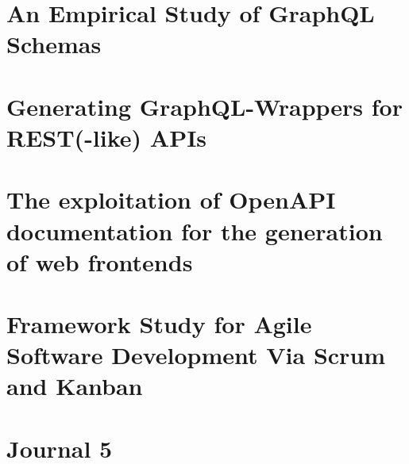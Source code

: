 \documentclass[oneside,openright,titlepage,numbers=noenddot,headinclude,footinclude=true,cleardoublepage=empty,listof=totoc,paper=a4,fontsize=11pt,english,BCOR=5mm]{scrreprt}
\begin{document}
  \frenchspacing
  \raggedbottom{}

  \pagestyle{plain}

  \singlespacing{}
  

  \cleardoublepage{}
  \pagestyle{scrheadings}
  \onehalfspacing{}

  \chapter{An Empirical Study of GraphQL Schemas}\label{c:Journal-1}
  

  \chapter{Generating GraphQL-Wrappers for REST(-like) APIs}\label{c:Journal-2}
  

  \chapter{The exploitation of OpenAPI documentation for the generation of web
  frontends}\label{c:Journal-3}
  

  \chapter{Framework Study for Agile Software Development Via Scrum and Kanban}\label{c:Journal-4}
  

  \chapter{Journal 5}\label{c:Journal-5}
  

  \cleardoublepage{}
  \appendix

  \singlespacing{}
  
  \cleardoublepage{}
\end{document}
